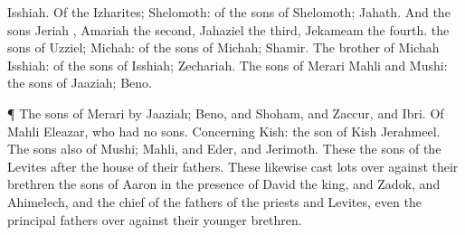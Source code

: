 {{}
Isshiah.
Of the
Izharites;
Shelomoth: of the
sons of
Shelomoth;
Jahath.
And the
sons
{}
Jeriah
{},
Amariah the
second,
Jahaziel the
third,
Jekameam the
fourth.
 the
sons of
Uzziel;
Michah: of the
sons of
Michah;
Shamir.
The
brother of
Michah
{}
Isshiah: of the
sons of
Isshiah;
Zechariah.
The
sons of
Merari
{}
Mahli and
Mushi: the
sons of
Jaaziah;
Beno.
\par }{\PP {}¶ The
sons of
Merari by
Jaaziah;
Beno, and
Shoham, and
Zaccur, and
Ibri.
Of
Mahli
{}
Eleazar, who had no
sons.
Concerning
Kish: the
son of
Kish
{}
Jerahmeel.
The
sons also of
Mushi;
Mahli, and
Eder, and
Jerimoth. These
{} the
sons of the
Levites after the
house of their
fathers.
These likewise
cast
lots over
against their
brethren the
sons of
Aaron in the
presence of
David the
king, and
Zadok, and
Ahimelech, and the
chief of the
fathers of the
priests and
Levites, even the
principal
fathers over
against their
younger
brethren.

}

